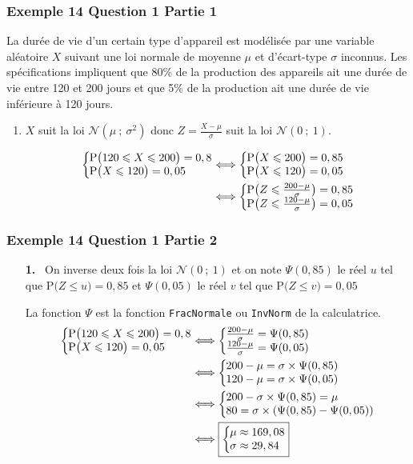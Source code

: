 \documentclass[xcolor=svgnames,t,final]{beamer}
\newcommand{\loinorm}[2]{\mathcal{N}\left(#1\ ; \ #2 \right)}
\newcommand{\proba}[1]{\text{P}\big(#1\big)}
\newcommand{\sys}[2]{
\left\lbrace
 \begin{array}{l}
  \negthickspace\negthickspace #1\\
  \negthickspace\negthickspace #2\\
 \end{array}
\right.\negthickspace\negthickspace}
\begin{document}
\begin{frame}
\frametitle{Exemple 14 Question 1 Partie 1}
\label{exemple14}

La durée de vie d'un certain type d'appareil est modélisée par une variable aléatoire $X$ suivant une loi normale de moyenne $\mu$ et d'écart-type $\sigma$ inconnus. Les spécifications impliquent que 80\% de la production des appareils ait une durée de vie entre 120 et 200 jours et que 5\% de la production ait une durée de vie inférieure à 120 jours.

\begin{enumerate}

\item  $X$ suit la loi $\loinorm{\mu}{\sigma^{2}}$ donc $Z=\frac{X - \mu}{\sigma}$ suit la loi $\loinorm{0}{1}$.

\begin{align*}
\sys{\proba{120 \leqslant X \leqslant 200} = 0,8 }{\proba{ X \leqslant 120} = 0,05} & \Longleftrightarrow 
\sys{\proba{ X \leqslant 200} = 0,85 }{\proba{ X \leqslant 120} = 0,05} \\
 & \Longleftrightarrow 
\sys{\proba{ Z \leqslant \frac{200-\mu}{\sigma}} = 0,85 }{\proba{ Z \leqslant \frac{120-\mu}{\sigma}} = 0,05} 
\end{align*}

\end{enumerate}

\end{frame}



\begin{frame}
\frametitle{Exemple 14 Question 1 Partie 2}


\begin{enumerate}

\item[\textbf{1.}~]  
On inverse deux fois la loi $\loinorm{0}{1}$ et on note $\Psi(0,85)$ le réel $u$ tel que $\proba{Z \leqslant u} = 0,85$ et $\Psi(0,05)$ le réel $v$ tel que $\proba{Z \leqslant v} = 0,05$

La fonction $\Psi$ est la fonction \texttt{FracNormale} ou \texttt{InvNorm} de la calculatrice.
\begin{align*}
\sys{\proba{120 \leqslant X \leqslant 200} = 0,8 }{\proba{ X \leqslant 120} = 0,05} & \Longleftrightarrow 
\sys{\frac{200-\mu}{\sigma} = \Psi(0,85) }{\frac{120-\mu}{\sigma} = \Psi(0,05)}  \\
  & \Longleftrightarrow 
\sys{200-\mu = \sigma \times \Psi(0,85)}{120-\mu = \sigma \times \Psi(0,05)}  \\
  & \Longleftrightarrow 
\sys{200-\sigma \times \Psi(0,85)  = \mu }{80 = \sigma \times ( \Psi(0,85) - \Psi(0,05) )} \\
  & \Longleftrightarrow 
\boxed{\sys{\mu \approx 169,08 }{\sigma \approx 29,84}}
\end{align*}


\end{enumerate}

\end{frame}
\end{document}
